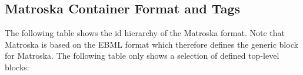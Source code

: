 

\subsection{Matroska Container Format and Tags}
\label{sec:MatroskaContainerFormats}

The following table shows the id hierarchy of the Matroska format. Note that Matroska is based on the EBML format which therefore defines the generic block for Matroska. The following table only shows a selection of defined top-level blocks:

